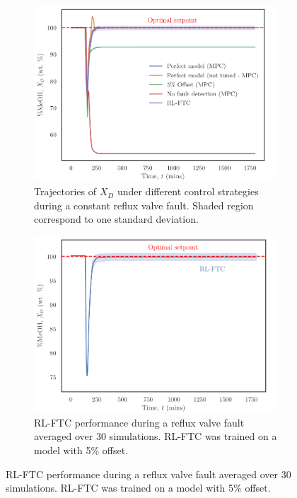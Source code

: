 \begin{figure}[H]
    \begin{center}
    \begin{subfigure}[b]{0.49\textwidth}
        \includegraphics[width=\textwidth]{images/ftc/FTC_Comparison.pdf}
        \caption{{\scriptsize Trajectories of $X_D$ under different control strategies during a constant reflux valve fault. Shaded region correspond to one standard deviation.}}
        \label{fig:ftcComparison}
    \end{subfigure}
    \hfill
    \begin{subfigure}[b]{0.49\textwidth}
        \includegraphics[width=\textwidth]{images/ftc/RL_FTC.pdf}
        \caption{{\scriptsize RL-FTC performance during a reflux valve fault averaged over 30 simulations.  RL-FTC was trained on a model with 5\% offset.}}
        \label{fig:ftcRL_FTCS}
    \end{subfigure}
    \end{center}
\end{figure}

